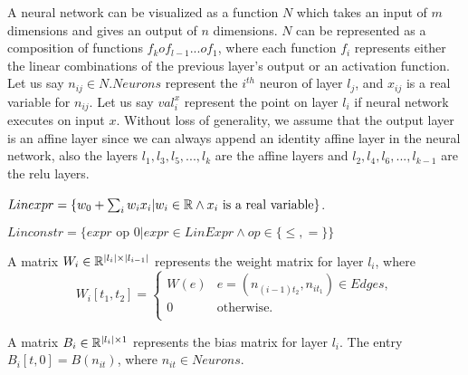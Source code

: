 A neural network can be visualized as a function $N$ which takes an input of $m$ dimensions and gives an 
output of $n$ dimensions. $N$ can be represented as a composition of functions $f_k o f_{l-1} ... o f_1$,
where each function $f_i$ represents either the linear combinations of the previous layer's
output or an activation function. Let us say $n_{ij} \in N.Neurons$ represent 
the $i^{th}$ neuron of layer $l_j$, and $x_{ij}$ is a real variable for $n_{ij}$. 
Let us say $val_i^{x}$ represent the point on layer $l_i$ if neural network executes on input $x$. 
Without loss of generality, we assume that the output layer is an affine layer 
since we can always append an identity affine layer in the neural network, also the layers $l_1, l_3, l_5, ..., l_k$ 
are the affine layers and $l_2, l_4, l_6, ..., l_{k-1}$ are the relu layers.  



\begin{df}
    \label{def:linexpr}
    $Linexpr = \{ w_0 + \sum_{i} w_i x_i | w_i \in \mathbb{R} \land x_i \text{ is a real variable} \}$.
\end{df}
  
\begin{df}
    \label{def:linconstr}
    $Linconstr = \{expr \text{ op } 0 | expr \in LinExpr \land op \in \{\leq, = \}\}$
\end{df}






\begin{df}
  A matrix $W_i \in \mathbb{R}^{|l_i|\times|l_{i-1}|}$ represents the weight matrix for layer $l_i$, where  
    $$
    W_i[t_1, t_2] = 
    \begin{cases}
      W(e) & e=(n_{(i-1)t_2}, n_{it_1}) \in Edges,\\
      0 & \text{otherwise.}\\
    \end{cases}
    $$
\end{df}

\begin{df}
    A matrix $B_i \in \mathbb{R}^{|l_i|\times 1}$ represents the bias matrix for layer $l_i$. The entry $B_i[t,0] = B(n_{it})$, where $n_{it} \in Neurons$. 
\end{df}




